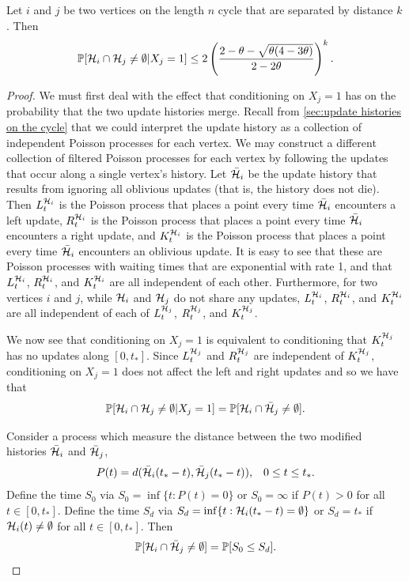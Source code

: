 \begin{lemma}
	\label{lem:A_ij bound conditioned}
		Let $i$ and $j$ be two vertices on the length $n$ cycle that are separated by distance $k$. Then
		\begin{equation}
			\mathbb{P}[\mathcal{H}_i \cap \mathcal{H}_j \neq \emptyset|X_{j} = 1] \leq 2\left(\frac{2 - \theta - \sqrt{\theta(4 - 3\theta)}}{2 - 2\theta}\right)^k.
		\end{equation}
	\end{lemma}
	\begin{proof}
		We must first deal with the effect that conditioning on $X_j = 1$ has on the probability that the two update histories merge. Recall from \ref{sec:update histories on the cycle} that we could interpret the update history as a collection of independent Poisson processes for each vertex. We may construct a different collection of filtered Poisson processes for each vertex by following the updates that occur along a single vertex's history. Let $\bar{\mathcal{H}}_i$ be the update history that results from ignoring all oblivious updates (that is, the history does not die). Then $L_t^{\mathcal{H}_i}$ is the Poisson process that places a point every time $\bar{\mathcal{H}}_i$ encounters a left update, $R_t^{\mathcal{H}_i}$ is the Poisson process that places a point every time $\bar{\mathcal{H}}_i$ encounters a right update, and $K_t^{\mathcal{H}_i}$ is the Poisson process that places a point every time $\bar{\mathcal{H}}_i$ encounters an oblivious update. It is easy to see that these are Poisson processes with waiting times that are exponential with rate 1, and that $L_t^{\mathcal{H}_i}$, $R_t^{\mathcal{H}_i}$, and $K_t^{\mathcal{H}_i}$ are all independent of each other. Furthermore, for two vertices $i$ and $j$, while $\mathcal{H}_i$ and $\mathcal{H}_j$ do not share any updates, $L_t^{\mathcal{H}_i}$, $R_t^{\mathcal{H}_i}$, and $K_t^{\mathcal{H}_i}$ are all independent of each of $L_t^{\mathcal{H}_j}$, $R_t^{\mathcal{H}_j}$, and $K_t^{\mathcal{H}_j}$.

		We now see that conditioning on $X_j = 1$ is equivalent to conditioning that $K_t^{\mathcal{H}_j}$ has no updates along $[0, t_*]$. Since $L_t^{\mathcal{H}_j}$ and $R_t^{\mathcal{H}_j}$ are independent of $K_t^{\mathcal{H}_j}$, conditioning on $X_j = 1$ does not affect the left and right updates and so we have that
		\begin{equation}
			\mathbb{P}[\mathcal{H}_i \cap \mathcal{H}_j \neq \emptyset | X_j = 1] = \mathbb{P}[\mathcal{H}_i \cap \bar{\mathcal{H}}_j \neq \emptyset].
		\end{equation}

		Consider a process which measure the distance between the two modified histories $\bar{\mathcal{H}}_i$ and $\bar{\mathcal{H}}_j$, 
		\begin{align}
			P(t) &= d(\bar{\mathcal{H}}_i(t_* - t), \bar{\mathcal{H}}_j(t_* - t)), & 0 \leq t\leq t_*.
		\end{align}
		Define the time $S_0$ via $S_0 = \inf\{t : P(t) = 0\}$ or $S_0 = \infty$ if $P(t) > 0$ for all $t \in [0, t_*]$. Define the time $S_d$ via $S_d = \inf\{t : \mathcal{H}_i(t_* - t) = \emptyset\}$ or $S_d = t_*$ if $\mathcal{H}_i(t) \neq \emptyset$ for all $t \in [0, t_*]$. Then
		\begin{equation}
			\mathbb{P}[\mathcal{H}_i \cap \bar{\mathcal{H}}_j \neq \emptyset] = \mathbb{P}[S_0 \leq S_d].
		\end{equation}





\end{proof}
